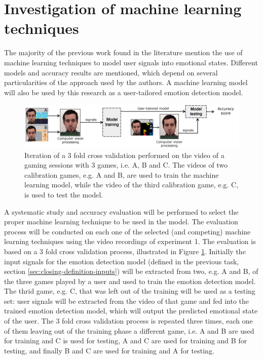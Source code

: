 \section{Investigation of machine learning techniques}
\label{closing:investigation-machine-learning}

The majority of the previous work found in the literature mention the use of machine learning techniques to model user signals into emotional states. Different models and accuracy results are mentioned, which depend on several particularities of the approach used by the authors. A machine learning model will also be used by this research as a user-tailored emotion detection model.

\begin{figure}[h]
    \centering
    \includegraphics[width=\textwidth]{figures/machine-learning-investigation.png}
    \caption{Iteration of a 3 fold cross validation performed on the video of a gaming sessions with 3 games, i.e. A, B and C. The videos of two calibration games, e.g. A and B, are used to train the machine learning model, while the video of the third calibration game, e.g. C, is used to test the model.}
    \label{fig:machine-learning-investigation}
\end{figure}

A systematic study and accuracy evaluation will be performed to select the proper machine learning technique to be used in the model. The evaluation process will be conducted on each one of the selected (and competing) machine learning techniques using the video recordings of experiment 1. The evaluation is based on a 3 fold cross validation process, illustrated in Figure \ref{fig:machine-learning-investigation}. Initially the input signals for the emotion detection model (defined in the previous task, section \ref{sec:closing-definition-inputs}) will be extracted from two, e.g. A and B, of the three games played by a user and used to train the emotion detection model. The thrid game, e.g. C, that was left out of the training will be used as a testing set: user signals will be extracted from the video of that game and fed into the trained emotion detection model, which will output the predicted emotional state of the user. The 3 fold cross validation process is repeated three times, each one of them leaving out of the training phase a different game, i.e. A and B are used for training and C is used for testing, A and C are used for training and B for testing, and finally B and C are used for training and A for testing.

